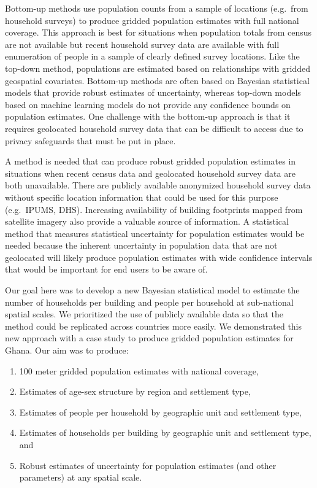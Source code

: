 \documentclass[]{book}
\providecommand{\tightlist}{%
  \setlength{\itemsep}{0pt}\setlength{\parskip}{0pt}}
\begin{document}
Bottom-up methods \citep{leasure2020national} use population counts from
a sample of locations (e.g.~from household surveys) to produce gridded
population estimates with full national coverage. This approach is best
for situations when population totals from census are not available but
recent household survey data are available with full enumeration of
people in a sample of clearly defined survey locations. Like the
top-down method, populations are estimated based on relationships with
gridded geospatial covariates. Bottom-up methods are often based on
Bayesian statistical models that provide robust estimates of
uncertainty, whereas top-down models based on machine learning models
\citep{stevens2015disaggregating} do not provide any confidence bounds
on population estimates. One challenge with the bottom-up approach is
that it requires geolocated household survey data that can be difficult
to access due to privacy safeguards that must be put in place.

A method is needed that can produce robust gridded population estimates
in situations when recent census data and geolocated household survey
data are both unavailable. There are publicly available anonymized
household survey data without specific location information that could
be used for this purpose (e.g.~IPUMS, DHS). Increasing availability of
building footprints mapped from satellite imagery also provide a
valuable source of information. A statistical method that measures
statistical uncertainty for population estimates would be needed because
the inherent uncertainty in population data that are not geolocated will
likely produce population estimates with wide confidence intervals that
would be important for end users to be aware of.

Our goal here was to develop a new Bayesian statistical model to
estimate the number of households per building and people per household
at sub-national spatial scales. We prioritized the use of publicly
available data so that the method could be replicated across countries
more easily. We demonstrated this new approach with a case study to
produce gridded population estimates for Ghana. Our aim was to produce:

\begin{enumerate}
\def\labelenumi{\arabic{enumi}.}
\tightlist
\item
  100 meter gridded population estimates with national coverage,
\item
  Estimates of age-sex structure by region and settlement type,
\item
  Estimates of people per household by geographic unit and settlement
  type,
\item
  Estimates of households per building by geographic unit and settlement
  type, and
\item
  Robust estimates of uncertainty for population estimates (and other
  parameters) at any spatial scale.
\end{enumerate}
\end{document}
